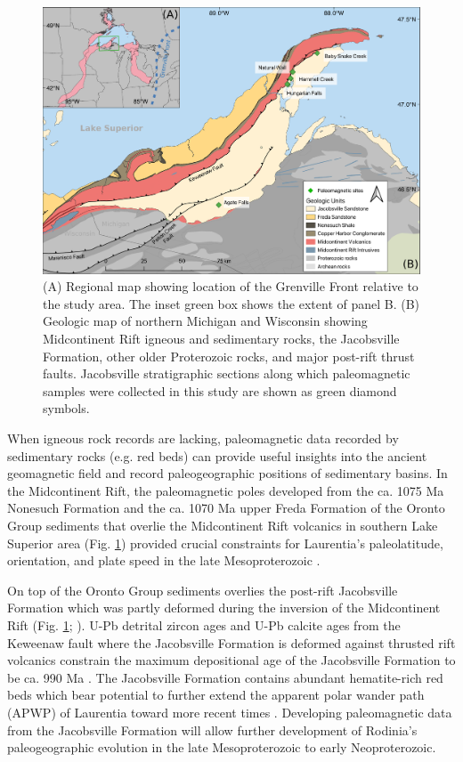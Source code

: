 \documentclass[draft]{agujournal2019}
\begin{document}
\begin{figure}[h!]
\centering
\includegraphics[width=\textwidth]{Geologic_map.pdf}
\caption{(A) Regional map showing location of the Grenville Front relative to the study area. The inset green box shows the extent of panel B. (B) Geologic map of northern Michigan and Wisconsin showing Midcontinent Rift igneous and sedimentary rocks, the Jacobsville Formation, other older Proterozoic rocks, and major post-rift thrust faults. Jacobsville stratigraphic sections along which paleomagnetic samples were collected in this study are shown as green diamond symbols.}
\label{fig:Geologic_map}
\end{figure}

When igneous rock records are lacking, paleomagnetic data recorded by sedimentary rocks (e.g. red beds) can provide useful insights into the ancient geomagnetic field and record paleogeographic positions of sedimentary basins. In the Midcontinent Rift, the paleomagnetic poles developed from the ca. 1075 Ma Nonesuch Formation and the ca. 1070 Ma upper Freda Formation of the Oronto Group sediments that overlie the Midcontinent Rift volcanics in southern Lake Superior area (Fig. \ref{fig:Geologic_map}) provided crucial constraints for Laurentia's paleolatitude, orientation, and plate speed in the late Mesoproterozoic \cite{Henry1977a, Swanson-Hysell2019a, Rose2022a}. 

On top of the Oronto Group sediments overlies the post-rift Jacobsville Formation which was partly deformed during the inversion of the Midcontinent Rift (Fig. \ref{fig:Geologic_map}; ). U-Pb detrital zircon ages and U-Pb calcite ages from the Keweenaw fault where the Jacobsville Formation is deformed against thrusted rift volcanics constrain the maximum depositional age of the Jacobsville Formation to be ca. 990 Ma \cite{Hodgin2022a}. The Jacobsville Formation contains abundant hematite-rich red beds which bear potential to further extend the apparent polar wander path (APWP) of Laurentia toward more recent times \cite{Hamblin1958a, Roy1978a}. Developing paleomagnetic data from the Jacobsville Formation will allow further development of Rodinia's paleogeographic evolution in the late Mesoproterozoic to early Neoproterozoic. 
\end{document}

